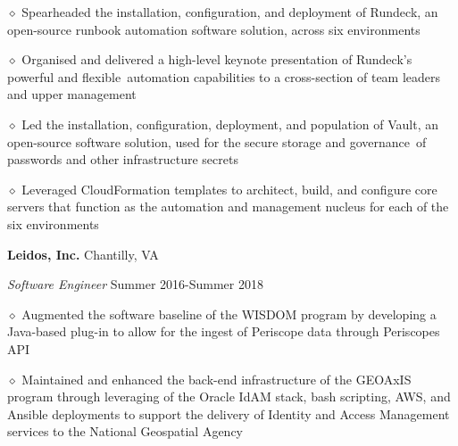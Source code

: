 \documentclass[executivepaper]{extarticle}
\begin{document}
\begin{center}
{\begin{minipage}{7.0in}
\vspace{0.25mm}

{\noindent $\diamond$ {\fontsize{12}{8}\selectfont Spearheaded the installation, configuration, and deployment of Rundeck, an open-source runbook automation software solution, across six environments}}

\vspace{0.25mm}

{\noindent $\diamond$ {\fontsize{12}{8}\selectfont Organised and delivered a high-level keynote presentation of Rundeck's powerful and flexible automation capabilities to a cross-section of team leaders and upper management}}

\vspace{0.25mm}

{\noindent $\diamond$ {\fontsize{12}{8}\selectfont Led the installation, configuration, deployment, and population of Vault, an open-source software solution, used for the secure storage and governance of passwords and other infrastructure secrets}}

\vspace{0.25mm}

{\noindent $\diamond$ {\fontsize{12}{8}\selectfont Leveraged CloudFormation templates to architect, build, and configure core servers that function as the automation and management nucleus for each of the six environments}}

\vspace{2mm}

{\noindent \textbf{\fontsize{12}{8}\selectfont Leidos, Inc.}} {\hfill \fontsize{10}{8}\selectfont Chantilly, VA}

\vspace{0.25mm}

{\noindent \textit{\fontsize{12}{8}\selectfont Software Engineer}} {\hfill \fontsize{10}{8}\selectfont Summer 2016-Summer 2018}

\vspace{0.25mm}

{\noindent $\diamond$ {\fontsize{12}{8}\selectfont Augmented the software baseline of the WISDOM program by developing a Java-based plug-in to allow for the ingest of Periscope data through Periscope\textsc{}s API}}

\vspace{0.25mm}

{\noindent $\diamond$ {\fontsize{12}{8}\selectfont Maintained and enhanced the back-end infrastructure of the GEOAxIS program through leveraging of the Oracle IdAM stack, bash scripting, AWS, and Ansible deployments to support the delivery of Identity and Access Management services to the National Geospatial Agency}}


\end{minipage}}
\end{center}
\end{document}
